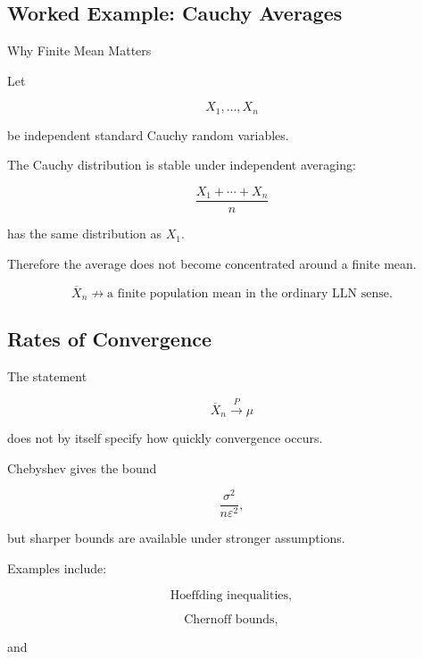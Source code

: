\subsection{Worked Example: Cauchy Averages}
\label{subsec:worked-cauchy-average}

\begin{workedexamplebox}{Why Finite Mean Matters}

Let

\[
X_1,\ldots,X_n
\]

be independent standard Cauchy random variables.

The Cauchy distribution is stable under independent averaging:

\[
\frac{
X_1+\cdots+X_n
}{n}
\]

has the same distribution as \(X_1\).

Therefore the average does not become concentrated around a finite
mean.

\begin{answerbox}
\[
\boxed{
\overline{X}_n
\not\to
\text{a finite population mean in the ordinary LLN sense}.
}
\]
\end{answerbox}

\end{workedexamplebox}

\subsection{Rates of Convergence}
\label{subsec:lln-rates-convergence}

The statement

\[
\overline{X}_n
\xrightarrow{P}
\mu
\]

does not by itself specify how quickly convergence occurs.

Chebyshev gives the bound

\[
\frac{\sigma^2}{n\varepsilon^2},
\]

but sharper bounds are available under stronger assumptions.

Examples include:

\[
\boxed{
\text{Hoeffding inequalities},
}
\]

\[
\boxed{
\text{Chernoff bounds},
}
\]

and

